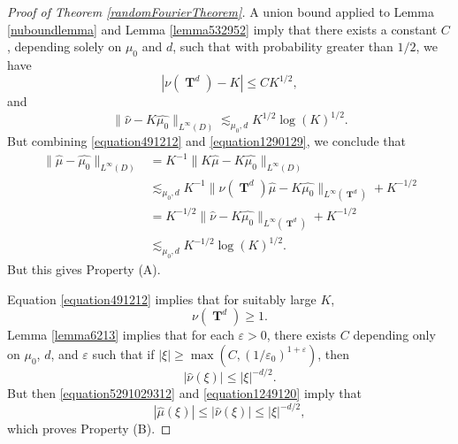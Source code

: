 \documentclass[12pt,reqno]{article}
\numberwithin{equation}{section}
\DeclareMathOperator{\TT}{\mathbf{T}}
\begin{document}
\begin{proof}[Proof of Theorem \ref{randomFourierTheorem}]
    A union bound applied to Lemma \ref{nuboundlemma} and Lemma \ref{lemma532952} imply that there exists a constant $C$, depending solely on $\mu_0$ and $d$, such that with probability greater than $1/2$, we have
    \begin{equation}\label{equation491212}
        |\nu(\TT^d) - K| \leq C K^{1/2},
    \end{equation}
    and
    \begin{equation}\label{equation1290129}
    \| \widehat{\nu} - K \widehat{\mu_0} \|_{L^\infty(D)} \lesssim_{\mu_0,d} K^{1/2} \log(K)^{1/2}.
    \end{equation}
    But combining \eqref{equation491212} and \eqref{equation1290129}, we conclude that
    \begin{equation} \label{equationGGSDEWTS}
    \begin{split}
        \| \widehat{\mu} - \widehat{\mu_0} \|_{L^\infty(D)} &= K^{-1} \| K \widehat{\mu} - K \widehat{\mu_0} \|_{L^\infty(D)}\\
        &\lesssim_{\mu_0,d} K^{-1} \| \nu(\TT^d) \widehat{\mu} - K \widehat{\mu_0} \|_{L^\infty(\TT^d)} + K^{-1/2} \\
        &= K^{-1/2} \| \widehat{\nu} - K \widehat{\mu_0} \|_{L^\infty(\TT^d)} + K^{-1/2}\\
        &\lesssim_{\mu_0,d} K^{-1/2} \log(K)^{1/2}.
    \end{split}
    \end{equation}
    But this gives Property (A).

    Equation \eqref{equation491212} implies that for suitably large $K$,
    \begin{equation} \label{equation5291029312}
        \nu(\TT^d) \geq 1.
    \end{equation}
    Lemma \ref{lemma6213} implies that for each $\varepsilon > 0$, there exists $C$ depending only on $\mu_0$, $d$, and $\varepsilon$ such that if $|\xi| \geq \max(C, (1/\varepsilon_0)^{1+\varepsilon})$, then
    \begin{equation} \label{equation1249120}
        |\widehat{\nu}(\xi)| \leq |\xi|^{-d/2}.
    \end{equation}
    But then \eqref{equation5291029312} and \eqref{equation1249120} imply that
    \[ |\widehat{\mu}(\xi)| \leq |\widehat{\nu}(\xi)| \leq |\xi|^{-d/2}, \]
    which proves Property (B).
\end{proof}
\end{document}
